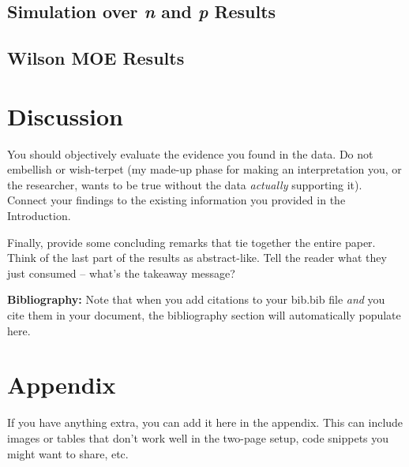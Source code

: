 \documentclass{article}\usepackage[]{graphicx}\usepackage[]{xcolor}
\begin{document}
\begin{multicols}{2}
\subsection{Simulation over \textit{n} and \textit{p} Results}

\subsection{Wilson MOE Results}


\section{Discussion}
 You should objectively evaluate the evidence you found in the data. Do not embellish or wish-terpet (my made-up phase for making an interpretation you, or the researcher, wants to be true without the data \emph{actually} supporting it). Connect your findings to the existing information you provided in the Introduction.

Finally, provide some concluding remarks that tie together the entire paper. Think of the last part of the results as abstract-like. Tell the reader what they just consumed -- what's the takeaway message?

\vspace{2em}

\noindent\textbf{Bibliography:} Note that when you add citations to your bib.bib file \emph{and}
you cite them in your document, the bibliography section will automatically populate here.

\begin{tiny}

\end{tiny}
\end{multicols}

\newpage
\onecolumn
\section{Appendix}

If you have anything extra, you can add it here in the appendix. This can include images or tables that don't work well in the two-page setup, code snippets you might want to share, etc.
\end{document}
